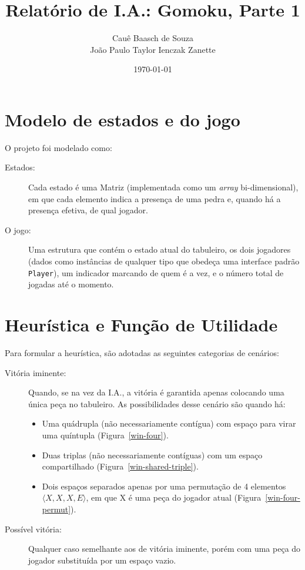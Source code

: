 \documentclass{article}
\title{Relatório de I.A.: Gomoku, Parte 1}
\author{Cauê Baasch de Souza \\
        João Paulo Taylor Ienczak Zanette}
\date{\today}
\begin{document}
    \maketitle{}

    \section{Modelo de estados e do jogo}

    O projeto foi modelado como:

    \begin{description}
        \item [Estados:] Cada estado é uma Matriz (implementada como um
            \textit{array} bi-dimensional), em que cada elemento indica a
            presença de uma pedra e, quando há a presença efetiva, de qual
            jogador.

        \item [O jogo:] Uma estrutura que contém o estado atual do tabuleiro,
            os dois jogadores (dados como instâncias de qualquer tipo que
            obedeça uma interface padrão \texttt{Player}), um indicador
            marcando de quem é a vez, e o número total de jogadas até o
            momento.
    \end{description}

    \section{Heurística e Função de Utilidade}

    Para formular a heurística, são adotadas as seguintes categorias de
    cenários:

    \begin{description}
        \item [Vitória iminente:] Quando, se na vez da I.A., a vitória é
            garantida apenas colocando uma única peça no tabuleiro. As
            possibilidades desse cenário são quando há:
            \begin{itemize}
                \item Uma quádrupla (não necessariamente contígua) com espaço
                    para virar uma quíntupla (Figura~\ref{win-four}).
                \item Duas triplas (não necessariamente contíguas) com um
                    espaço compartilhado (Figura~\ref{win-shared-triple}).
                \item Dois espaços separados apenas por uma permutação de 4
                    elementos $\langle X, X, X, E \rangle$, em que X é uma peça
                    do jogador atual (Figura~\ref{win-four-permut}).
            \end{itemize}

        \item [Possível vitória:] Qualquer caso semelhante aos de vitória
            iminente, porém com uma peça do jogador substituída por um espaço
            vazio.
    \end{description}
\end{document}
